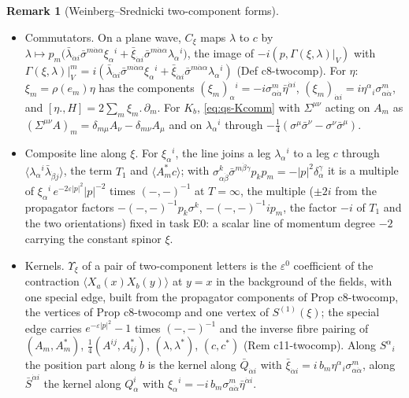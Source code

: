 \documentclass[11pt]{article}
\numberwithin{equation}{section}
\theoremstyle{plain}
\theoremstyle{definition}
\newtheorem{remark}[theorem]{Remark}
\begin{document}
\begin{remark}[Weinberg--Srednicki two-component forms]
\begin{itemize}
\item Commutators. On a plane wave, $C_\xi$ maps $\lambda$ to $c$ by $\lambda\mapsto p_m\big(\bar\lambda_{\dot\alpha i}\bar\sigma^{m\dot\alpha\alpha}\xi_\alpha{}^i+\bar\xi_{\dot\alpha i}\bar\sigma^{m\dot\alpha\alpha}\lambda_\alpha{}^i\big)$, the image of $-i(p,\Gamma(\xi,\lambda)|_V)$ with $\Gamma(\xi,\lambda)|_V^m=i(\bar\lambda_{\dot\alpha i}\bar\sigma^{m\dot\alpha\alpha}\xi_\alpha{}^i+\bar\xi_{\dot\alpha i}\bar\sigma^{m\dot\alpha\alpha}\lambda_\alpha{}^i)$ (Def c8-twocomp). For $\eta$: $\xi_m=\rho(e_m)\eta$ has the components $(\xi_m)_\alpha{}^i=-i\sigma^m_{\alpha\dot\alpha}\bar\eta^{\dot\alpha i}$, $(\xi_m)_{\dot\alpha i}=i\eta^\alpha{}_i\sigma^m_{\alpha\dot\alpha}$, and $[\eta.,H]=2\sum_m\xi_m.\,\partial_m$. For $K_b$, \eqref{eq:qs-Kcomm} with $\Sigma^{\mu\nu}$ acting on $A_m$ as $(\Sigma^{\mu\nu}A)_m=\delta_{m\mu}A_\nu-\delta_{m\nu}A_\mu$ and on $\lambda_\alpha{}^i$ through $-\tfrac14(\sigma^\mu\bar\sigma^\nu-\sigma^\nu\bar\sigma^\mu)$.
\item Composite line along $\xi$. For $\xi_\alpha{}^i$, the line joins a leg $\lambda_\alpha{}^i$ to a leg $c$ through $\langle\lambda_\alpha{}^i\bar\lambda_{\dot\beta j}\rangle$, the term $T_1$ and $\langle A^*_mc\rangle$; with $\sigma^k_{\alpha\dot\beta}\bar\sigma^{m\dot\beta\gamma}p_kp_m=-|p|^2\delta_\alpha^\gamma$ it is a multiple of $\xi_\alpha{}^i\,e^{-2\varepsilon|p|^2}|p|^{-2}$ times $(-,-)^{-1}$ at $T=\infty$, the multiple ($\pm2i$ from the propagator factors $-(-,-)^{-1}p_k\sigma^k$, $-(-,-)^{-1}ip_m$, the factor $-i$ of $T_1$ and the two orientations) fixed in task E0: a scalar line of momentum degree $-2$ carrying the constant spinor $\xi$.
\item Kernels. $\Upsilon_\xi$ of a pair of two-component letters is the $\varepsilon^0$ coefficient of the contraction $\langle X_a(x)X_b(y)\rangle$ at $y=x$ in the background of the fields, with one special edge, built from the propagator components of Prop c8-twocomp, the vertices of Prop c8-twocomp and one vertex of $S^{(1)}(\xi)$; the special edge carries $e^{-\varepsilon|p|^2}-1$ times $(-,-)^{-1}$ and the inverse fibre pairing of $(A_m,A^*_m)$, $\tfrac14(A^{ij},A^*_{ij})$, $(\lambda,\lambda^*)$, $(c,c^*)$ (Rem c11-twocomp). Along $S^\alpha{}_i$ the position part along $b$ is the kernel along $\bar Q_{\dot\alpha i}$ with $\bar\xi_{\dot\alpha i}=i\,b_m\eta^\alpha{}_i\sigma^m_{\alpha\dot\alpha}$, along $\bar S^{\dot\alpha i}$ the kernel along $Q^i_\alpha$ with $\xi_\alpha{}^i=-i\,b_m\sigma^m_{\alpha\dot\alpha}\bar\eta^{\dot\alpha i}$.

\end{itemize}
\end{remark}
\end{document}
